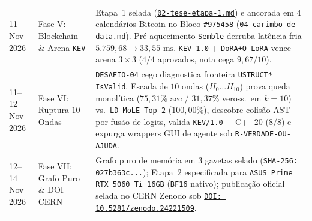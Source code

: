\documentclass[10pt,a4paper]{article}
\begin{document}
\begin{table}[!htbp]
\begin{tabularx}{\linewidth}{@{}llY@{}}
11 Nov 2026 & Fase V: Blockchain \& Arena \texttt{KEV} & Etapa~1 selada (\href{https://drive.google.com/file/d/1qvnH-nLVMc43T-prWSRTKEDJak89TSp7/view?usp=drivesdk}{\texttt{02-tese-etapa-1.md}}) e ancorada em 4 calend\'arios Bitcoin no Bloco \texttt{\#975458} (\href{https://drive.google.com/file/d/1OwjPlXRdBPydtqypoRHNfByfMSmx-Bwb/view?usp=drivesdk}{\texttt{04-carimbo-de-data.md}}). Pr\'e-aquecimento \texttt{Semble} derruba lat\^encia fria $5.759,68\to 33,55\text{ ms}$. \texttt{KEV-1.0} + \texttt{DoRA+O-LoRA} vence arena $3\times 3$ ($4/4$ aprovados, nota cega $9,67/10$). \\
11--12 Nov 2026 & Fase VI: Ruptura $10$ Ondas & \texttt{DESAFIO-04} cego diagnostica fronteira \texttt{USTRUCT*} \texttt{IsValid}. Escada de $10$ ondas ($H_0\dots H_{10}$) prova queda monol\'itica ($75,31\%$ acc / $31,37\%$ veross.\ em $k=10$) vs.\ \texttt{LD-MoLE Top-2} ($100,00\%$), descobre colis\~ao AST por fus\~ao de logits, valida \texttt{KEV/1.0} + C++20 ($8/8$) e expurga wrappers GUI de agente sob \texttt{R-VERDADE-OU-AJUDA}. \\
12--14 Nov 2026 & Fase VII: Grafo Puro \& DOI CERN & Grafo puro de mem\'oria em 3 gavetas selado (\texttt{SHA-256: 027b363c...}); Etapa~2 especificada para \texttt{ASUS Prime RTX 5060 Ti 16GB} (\texttt{BF16} nativo); publica\c{c}\~ao oficial selada no CERN Zenodo sob \href{https://doi.org/10.5281/zenodo.24221509}{\texttt{DOI:\,10.5281/zenodo.24221509}}. \\
\bottomrule
\end{tabularx}
\end{table}
\end{document}
